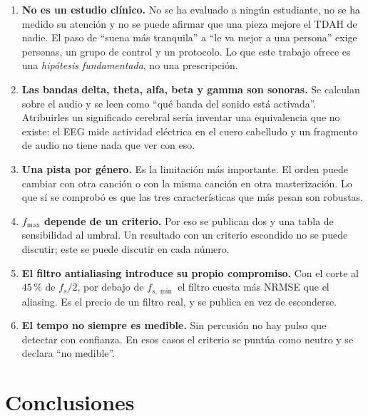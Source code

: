 \documentclass[11pt,a4paper]{article}
\newcommand{\fs}{f_s}
\newcommand{\fsmin}{f_{s,\min}}
\newcommand{\fmax}{f_{\max}}
\begin{document}
\begin{enumerate}
  \item \textbf{No es un estudio clínico.} No se ha evaluado a ningún
        estudiante, no se ha medido su atención y no se puede afirmar que una
        pieza mejore el TDAH de nadie. El paso de ``suena más tranquila'' a
        ``le va mejor a una persona'' exige personas, un grupo de control y un
        protocolo. Lo que este trabajo ofrece es una \emph{hipótesis
        fundamentada}, no una prescripción.

  \item \textbf{Las bandas delta, theta, alfa, beta y gamma son sonoras.} Se
        calculan sobre el audio y se leen como ``qué banda del sonido está
        activada''. Atribuirles un significado cerebral sería inventar una
        equivalencia que no existe: el EEG mide actividad eléctrica en el
        cuero cabelludo y un fragmento de audio no tiene nada que ver con eso.

  \item \textbf{Una pista por género.} Es la limitación más importante. El
        orden puede cambiar con otra canción o con la misma canción en otra
        masterización. Lo que sí se comprobó es que las tres características
        que más pesan son robustas.

  \item \textbf{\(\fmax\) depende de un criterio.} Por eso se publican dos y una
        tabla de sensibilidad al umbral. Un resultado con un criterio escondido
        no se puede discutir; este se puede discutir en cada número.

  \item \textbf{El filtro antialiasing introduce su propio compromiso.} Con el
        corte al \(45\)\,\% de \(\fs/2\), por debajo de \(\fsmin\) el filtro
        cuesta más NRMSE que el aliasing. Es el precio de un filtro real, y se
        publica en vez de esconderse.

  \item \textbf{El tempo no siempre es medible.} Sin percusión no hay pulso que
        detectar con confianza. En esos casos el criterio se puntúa como neutro
        y se declara ``no medible''.
\end{enumerate}

\section{Conclusiones}\label{sec:conclusiones}
\end{document}
